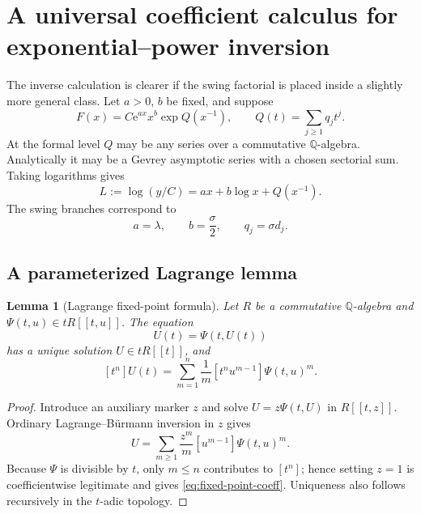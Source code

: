 \documentclass[11pt,a4paper]{article}
\numberwithin{equation}{section}
\newtheorem{lemma}[theorem]{Lemma}
\theoremstyle{definition}
\theoremstyle{remark}
\newcommand{\e}{\mathrm e}
\begin{document}
\section{A universal coefficient calculus for exponential--power inversion}
\label{sec:universal-calculus}

The inverse calculation is clearer if the swing factorial is placed inside a
slightly more general class.  Let \(a>0\), \(b\) be fixed, and suppose
\begin{equation}\label{eq:general-model}
 F(x)=C\e^{ax}x^b\exp Q(x^{-1}),
 \qquad Q(t)=\sum_{j\ge1}q_jt^j.
\end{equation}
At the formal level \(Q\) may be any series over a commutative
\(\mathbb Q\)-algebra.  Analytically it may be a Gevrey asymptotic series
with a chosen sectorial sum.  Taking logarithms gives
\begin{equation}\label{eq:general-log-equation}
 L:=\log(y/C)=ax+b\log x+Q(x^{-1}).
\end{equation}
The swing branches correspond to
\begin{equation}\label{eq:swing-specialization}
 a=\lambda,
 \qquad b=\frac\sigma2,
 \qquad q_j=\sigma d_j.
\end{equation}

\subsection{A parameterized Lagrange lemma}

\begin{lemma}[Lagrange fixed-point formula]\label{lem:fixed-point-LB}
Let \(R\) be a commutative \(\mathbb Q\)-algebra and
\(\Psi(t,u)\in tR[[t,u]]\).  The equation
\begin{equation}\label{eq:fixed-point}
 U(t)=\Psi(t,U(t))
\end{equation}
has a unique solution \(U\in tR[[t]]\), and
\begin{equation}\label{eq:fixed-point-coeff}
 [t^n]U(t)=
 \sum_{m=1}^n\frac1m[t^nu^{m-1}]\Psi(t,u)^m.
\end{equation}
\end{lemma}

\begin{proof}
Introduce an auxiliary marker \(z\) and solve
\(U=z\Psi(t,U)\) in \(R[[t,z]]\).  Ordinary Lagrange--B\"urmann inversion in
\(z\) gives
\[
 U=\sum_{m\ge1}\frac{z^m}{m}[u^{m-1}]\Psi(t,u)^m.
\]
Because \(\Psi\) is divisible by \(t\), only \(m\le n\) contributes to
\([t^n]\); hence setting \(z=1\) is coefficientwise legitimate and gives
\cref{eq:fixed-point-coeff}.  Uniqueness also follows recursively in the
\(t\)-adic topology.
\end{proof}
\end{document}
